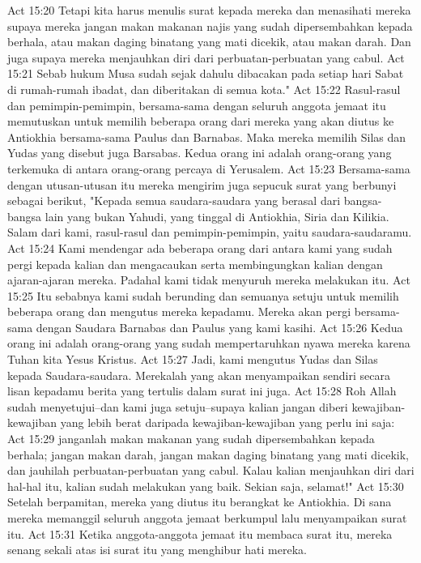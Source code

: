 Act 15:20  Tetapi kita harus menulis surat kepada mereka dan menasihati mereka supaya mereka jangan makan makanan najis yang sudah dipersembahkan kepada berhala, atau makan daging binatang yang mati dicekik, atau makan darah. Dan juga supaya mereka menjauhkan diri dari perbuatan-perbuatan yang cabul.
Act 15:21  Sebab hukum Musa sudah sejak dahulu dibacakan pada setiap hari Sabat di rumah-rumah ibadat, dan diberitakan di semua kota."
Act 15:22  Rasul-rasul dan pemimpin-pemimpin, bersama-sama dengan seluruh anggota jemaat itu memutuskan untuk memilih beberapa orang dari mereka yang akan diutus ke Antiokhia bersama-sama Paulus dan Barnabas. Maka mereka memilih Silas dan Yudas yang disebut juga Barsabas. Kedua orang ini adalah orang-orang yang terkemuka di antara orang-orang percaya di Yerusalem.
Act 15:23  Bersama-sama dengan utusan-utusan itu mereka mengirim juga sepucuk surat yang berbunyi sebagai berikut, "Kepada semua saudara-saudara yang berasal dari bangsa-bangsa lain yang bukan Yahudi, yang tinggal di Antiokhia, Siria dan Kilikia. Salam dari kami, rasul-rasul dan pemimpin-pemimpin, yaitu saudara-saudaramu.
Act 15:24  Kami mendengar ada beberapa orang dari antara kami yang sudah pergi kepada kalian dan mengacaukan serta membingungkan kalian dengan ajaran-ajaran mereka. Padahal kami tidak menyuruh mereka melakukan itu.
Act 15:25  Itu sebabnya kami sudah berunding dan semuanya setuju untuk memilih beberapa orang dan mengutus mereka kepadamu. Mereka akan pergi bersama-sama dengan Saudara Barnabas dan Paulus yang kami kasihi.
Act 15:26  Kedua orang ini adalah orang-orang yang sudah mempertaruhkan nyawa mereka karena Tuhan kita Yesus Kristus.
Act 15:27  Jadi, kami mengutus Yudas dan Silas kepada Saudara-saudara. Merekalah yang akan menyampaikan sendiri secara lisan kepadamu berita yang tertulis dalam surat ini juga.
Act 15:28  Roh Allah sudah menyetujui--dan kami juga setuju--supaya kalian jangan diberi kewajiban-kewajiban yang lebih berat daripada kewajiban-kewajiban yang perlu ini saja:
Act 15:29  janganlah makan makanan yang sudah dipersembahkan kepada berhala; jangan makan darah, jangan makan daging binatang yang mati dicekik, dan jauhilah perbuatan-perbuatan yang cabul. Kalau kalian menjauhkan diri dari hal-hal itu, kalian sudah melakukan yang baik. Sekian saja, selamat!"
Act 15:30  Setelah berpamitan, mereka yang diutus itu berangkat ke Antiokhia. Di sana mereka memanggil seluruh anggota jemaat berkumpul lalu menyampaikan surat itu.
Act 15:31  Ketika anggota-anggota jemaat itu membaca surat itu, mereka senang sekali atas isi surat itu yang menghibur hati mereka.
